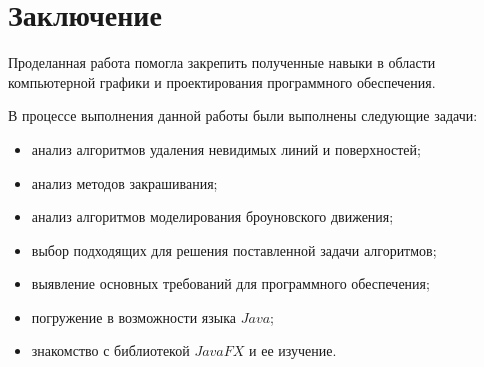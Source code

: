 \chapter*{Заключение}

Проделанная работа помогла закрепить полученные навыки в области компьютерной графики и проектирования программного обеспечения.

В процессе выполнения данной работы были выполнены следующие задачи:

\begin{itemize}
	\item анализ алгоритмов удаления невидимых линий и поверхностей;
	\item анализ методов закрашивания;
	\item анализ алгоритмов моделирования броуновского движения;
	\item выбор подходящих для решения поставленной задачи алгоритмов;
	\item выявление основных требований для программного обеспечения;
	\item погружение в возможности языка $Java$;
    \item знакомство с библиотекой $JavaFX$ и ее изучение.
\end{itemize}

